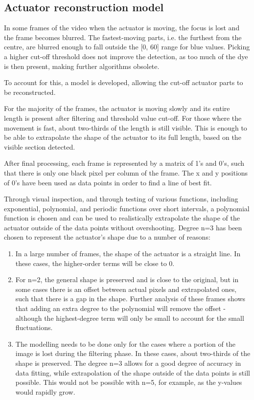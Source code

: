 \subsection{Actuator reconstruction model}
In some frames of the video when the actuator is moving, the focus is lost and the frame becomes blurred. The fastest-moving parts, i.e. the furthest from the centre, are blurred enough to fall outside the [0, 60] range for blue values. Picking a higher cut-off threshold does not improve the detection, as too much of the dye is then present, making further algorithms obsolete.

To account for this, a model is developed, allowing the cut-off actuator parts to be reconstructed. 

For the majority of the frames, the actuator is moving slowly and its entire length is present after filtering and threshold value cut-off. For those where the movement is fast, about two-thirds of the length is still visible. This is enough to be able to extrapolate the shape of the actuator to its full length, based on the visible section detected. 

After final processing, each frame is represented by a matrix of 1’s and 0’s, such that there is only one black pixel per column of the frame. The x and y positions of 0’s have been used as data points in order to find a line of best fit. 

Through visual inspection, and through testing of various functions, including exponential, polynomial, and periodic functions over short intervals, a polynomial function is chosen and can be used to realistically extrapolate the shape of the actuator outside of the data points without overshooting. Degree n=3 has been chosen to represent the actuator’s shape due to a number of reasons:
\begin{enumerate}
  	\item	In a large number of frames, the shape of the actuator is a straight line. In these cases, the higher-order terms will be close to 0.
  	\item	For n=2, the general shape is preserved and is close to the original, but in some cases there is an offset between actual pixels and extrapolated ones, such that there is a gap in the shape. Further analysis of these frames shows that adding an extra degree to the polynomial will remove the offset - although the highest-degree term will only be small to account for the small fluctuations.
	\item	The modelling needs to be done only for the cases where a portion of the image is lost during the filtering phase. In these cases, about two-thirds of the shape is preserved.  The degree n=3 allows for a good degree of accuracy in data fitting, while extrapolation of the shape outside of the data points is still possible. This would not be possible with n=5, for example, as the y-values would rapidly grow.
	
\end{enumerate}	

